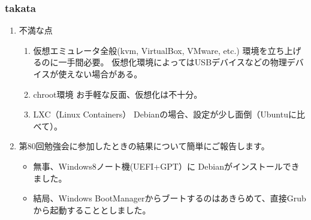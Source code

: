 \documentclass[cjk,dvipdfmx,10pt,compress,%
hyperref={bookmarks=true,bookmarksnumbered=true,bookmarksopen=false,%
colorlinks=false,%
pdftitle={第 82 回 関西 Debian 勉強会},%
pdfauthor={倉敷・のがた・佐々木・かわだ・八津尾},%
pdfsubject={資料},%
}]{beamer}
\begin{document}
\begin{frame}
  \frametitle{ takata }
  \begin{enumerate}
  \item 不満な点
    \begin{enumerate}
    \item 仮想エミュレータ全般(kvm, VirtualBox, VMware, etc.)
      環境を立ち上げるのに一手間必要。
      仮想化環境によってはUSBデバイスなどの物理デバイスが使えない場合がある。
    \item chroot環境
      お手軽な反面、仮想化は不十分。
    \item LXC（Linux Containers）
      Debianの場合、設定が少し面倒（Ubuntuに比べて）。
    \end{enumerate}
  \item 第80回勉強会に参加したときの結果について簡単にご報告します。
    \begin{itemize}
    \item 無事、Windows8ノート機(UEFI+GPT）に Debianがインストールできました。
    \item 結局、Windows BootManagerからブートするのはあきらめて、直接Grubから起動することとしました。
    \end{itemize}
  \end{enumerate}
\end{frame}
\end{document}
